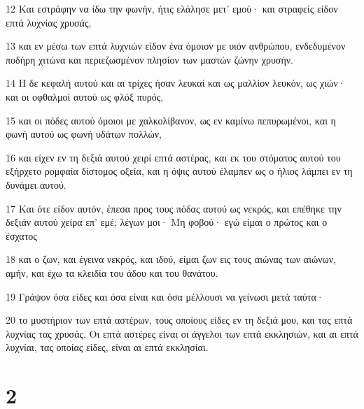 \par 12 Και εστράφην να ίδω την φωνήν, ήτις ελάλησε μετ' εμού· και στραφείς είδον επτά λυχνίας χρυσάς,
\par 13 και εν μέσω των επτά λυχνιών είδον ένα όμοιον με υιόν ανθρώπου, ενδεδυμένον ποδήρη χιτώνα και περιεζωσμένον πλησίον των μαστών ζώνην χρυσήν.
\par 14 Η δε κεφαλή αυτού και αι τρίχες ήσαν λευκαί και ως μαλλίον λευκόν, ως χιών· και οι οφθαλμοί αυτού ως φλόξ πυρός,
\par 15 και οι πόδες αυτού όμοιοι με χαλκολίβανον, ως εν καμίνω πεπυρωμένοι, και η φωνή αυτού ως φωνή υδάτων πολλών,
\par 16 και είχεν εν τη δεξιά αυτού χειρί επτά αστέρας, και εκ του στόματος αυτού του εξήρχετο ρομφαία δίστομος οξεία, και η όψις αυτού έλαμπεν ως ο ήλιος λάμπει εν τη δυνάμει αυτού.
\par 17 Και ότε είδον αυτόν, έπεσα προς τους πόδας αυτού ως νεκρός, και επέθηκε την δεξιάν αυτού χείρα επ' εμέ; λέγων μοι· Μη φοβού· εγώ είμαι ο πρώτος και ο έσχατος
\par 18 και ο ζων, και έγεινα νεκρός, και ιδού, είμαι ζων εις τους αιώνας των αιώνων, αμήν, και έχω τα κλειδία του άδου και του θανάτου.
\par 19 Γράψον όσα είδες και όσα είναι και όσα μέλλουσι να γείνωσι μετά ταύτα·
\par 20 το μυστήριον των επτά αστέρων, τους οποίους είδες εν τη δεξιά μου, και τας επτά λυχνίας τας χρυσάς. Οι επτά αστέρες είναι οι άγγελοι των επτά εκκλησιών, και αι επτά λυχνίαι, τας οποίας είδες, είναι αι επτά εκκλησίαι.

\chapter{2}

